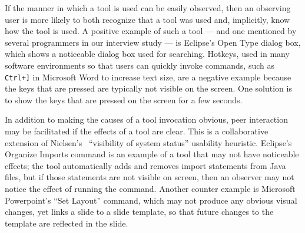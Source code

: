 \documentclass[smallextended]{svjour3}
\newcommand\discovery{peer interaction\xspace}
\begin{document}
 If the manner in which a tool is used can be
easily observed, then an observing user is more likely to
both recognize that a tool was used and, implicitly, know how the tool is used.
A positive example of such a tool --- and one mentioned by several
programmers in our interview study --- is Eclipse's Open Type dialog box, which
shows a noticeable dialog box used for searching.
Hotkeys, used in many software environments so that
users can quickly invoke commands, such as \texttt{Ctrl+]} in Microsoft Word to increase text size, 
are a negative example because the
keys that are pressed are typically not visible on the screen.
One solution is to show the keys that are pressed on the screen for
a few seconds.


In addition to making the causes of a tool invocation obvious, \discovery may
be facilitated if the effects of a tool are clear.
This is a collaborative extension of Nielsen's~\citeyearpar{nielsenBook} ``visibility of system status'' 
usability heuristic.
Eclipse's Organize Imports command is an example of a tool that may not have
noticeable effects; the tool automatically adds and removes import statements
from Java files, but if those statements are not visible on screen, then an
observer may not notice the effect of running the command.
Another counter example is Microsoft Powerpoint's ``Set Layout'' command, which may
not produce any obvious visual changes, yet links a slide to a slide template, so that
future changes to the template are reflected in the slide.
\end{document}
